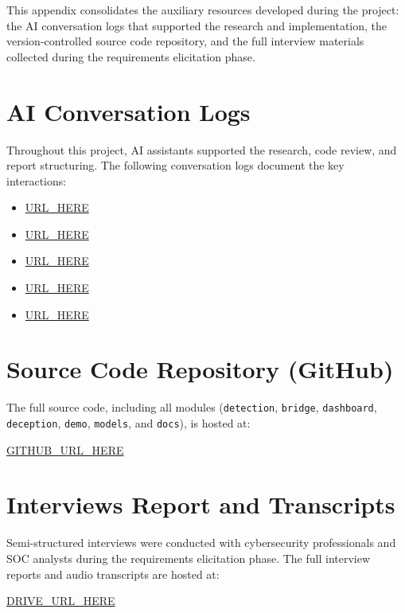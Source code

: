 \documentclass[12pt,a4paper]{report}
\begin{document}
This appendix consolidates the auxiliary resources developed during the project: the AI conversation logs that supported the research and implementation, the version-controlled source code repository, and the full interview materials collected during the requirements elicitation phase.

\section{AI Conversation Logs}

Throughout this project, AI assistants supported the research, code review, and report structuring. The following conversation logs document the key interactions:

\begin{itemize}
    \item \href{URL_HERE}{URL_HERE}
    \item \href{URL_HERE}{URL_HERE}
    \item \href{URL_HERE}{URL_HERE}
    \item \href{URL_HERE}{URL_HERE}
    \item \href{URL_HERE}{URL_HERE}
\end{itemize}

\section{Source Code Repository (GitHub)}

The full source code, including all modules (\texttt{detection}, \texttt{bridge}, \texttt{dashboard}, \texttt{deception}, \texttt{demo}, \texttt{models}, and \texttt{docs}), is hosted at:

\begin{center}
\href{GITHUB_URL_HERE}{GITHUB_URL_HERE}
\end{center}

\section{Interviews Report and Transcripts}

Semi-structured interviews were conducted with cybersecurity professionals and SOC analysts during the requirements elicitation phase. The full interview reports and audio transcripts are hosted at:

\begin{center}
\href{DRIVE_URL_HERE}{DRIVE_URL_HERE}
\end{center}
\end{document}
